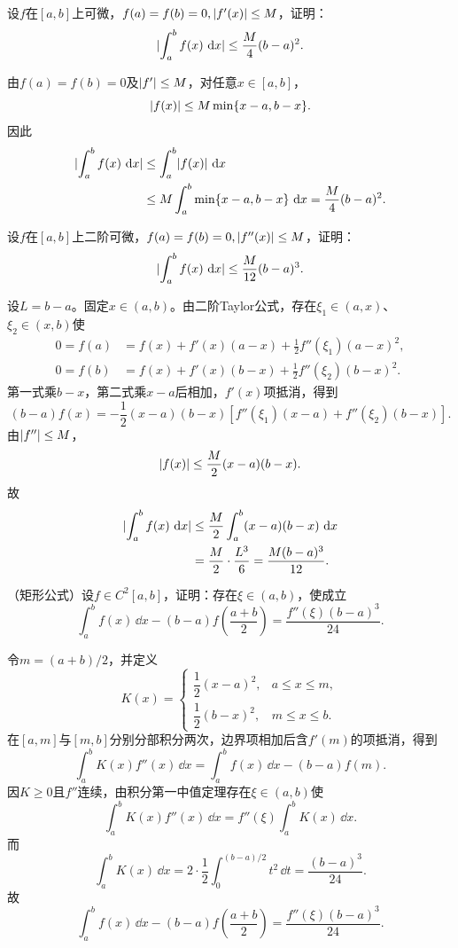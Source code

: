 \begin{xexercise}[6]
设$f$在$[a,b]$上可微，$f(a)=f(b)=0,\lvert f'(x)\rvert\le M$，证明：
  \[
    \lvert\int_a^bf(x)\,\mathop{}\!\mathrm{d} x\rvert\le\frac M4(b-a)^2.
  \]
\end{xexercise}
\begin{xsolution}
由$f(a)=f(b)=0$及$\lvert f'\rvert\le M$，对任意$x\in[a,b]$，
\[
 \lvert f(x)\rvert\le M\min\{x-a,b-x\}.
\]
因此
\begin{align*}
\lvert\int_a^bf(x)\,\mathop{}\!\mathrm{d} x\rvert
&\le\int_a^b\lvert f(x)\rvert\,\mathop{}\!\mathrm{d} x\\
&\le M\int_a^b\min\{x-a,b-x\}\,\mathop{}\!\mathrm{d} x
=\frac M4(b-a)^2.
\end{align*}
\end{xsolution}


\begin{xexercise}[7]
设$f$在$[a,b]$上二阶可微，$f(a)=f(b)=0,\lvert f''(x)\rvert\le M$，证明：
  \[
    \lvert\int_a^bf(x)\,\mathop{}\!\mathrm{d} x\rvert\le\frac M{12}(b-a)^3.
  \]
\end{xexercise}
\begin{xsolution}
设$L=b-a$。固定$x\in(a,b)$。由二阶Taylor公式，存在$\xi_1\in(a,x)$、$\xi_2\in(x,b)$使
\begin{align*}
0=f(a)&=f(x)+f'(x)(a-x)+\frac12f''(\xi_1)(a-x)^2,\\
0=f(b)&=f(x)+f'(x)(b-x)+\frac12f''(\xi_2)(b-x)^2.
\end{align*}
第一式乘$b-x$，第二式乘$x-a$后相加，$f'(x)$项抵消，得到
\[
 (b-a)f(x)
 =-\frac12(x-a)(b-x)
 \left[f''(\xi_1)(x-a)+f''(\xi_2)(b-x)\right].
\]
由$\lvert f''\rvert\le M$，
\[
 \lvert f(x)\rvert\le\frac M2(x-a)(b-x).
\]
故
\begin{align*}
\lvert\int_a^bf(x)\,\mathop{}\!\mathrm{d} x\rvert
&\le\frac M2\int_a^b(x-a)(b-x)\,\mathop{}\!\mathrm{d} x\\
&=\frac M2\cdot\frac{L^3}{6}
=\frac{M(b-a)^3}{12}.
\end{align*}
\end{xsolution}


\begin{xexercise}[8]
（矩形公式）设$f\in C^2[a,b]$，证明：存在$\xi\in(a,b)$，使成立
  \[
    \int_a^bf(x)\,\dd x-(b-a)f\left(\frac{a+b}{2}\right)=\frac{f''(\xi)(b-a)^3}{24}.
  \]
\end{xexercise}
\begin{xsolution}
令$m=(a+b)/2$，并定义
\[
 K(x)=
 \begin{cases}
 \dfrac12(x-a)^2,&a\le x\le m,\\[4pt]
 \dfrac12(b-x)^2,&m\le x\le b.
 \end{cases}
\]
在$[a,m]$与$[m,b]$分别分部积分两次，边界项相加后含$f'(m)$的项抵消，得到
\[
 \int_a^bK(x)f''(x)\,\dd x
 =\int_a^bf(x)\,\dd x-(b-a)f(m).
\]
因$K\ge0$且$f''$连续，由积分第一中值定理存在$\xi\in(a,b)$使
\[
 \int_a^bK(x)f''(x)\,\dd x
 =f''(\xi)\int_a^bK(x)\,\dd x.
\]
而
\[
 \int_a^bK(x)\,\dd x
 =2\cdot\frac12\int_0^{(b-a)/2}t^2\,\dd t
 =\frac{(b-a)^3}{24}.
\]
故
\[
 \int_a^bf(x)\,\dd x-(b-a)f\left(\frac{a+b}{2}\right)
 =\frac{f''(\xi)(b-a)^3}{24}.
\]
\end{xsolution}



